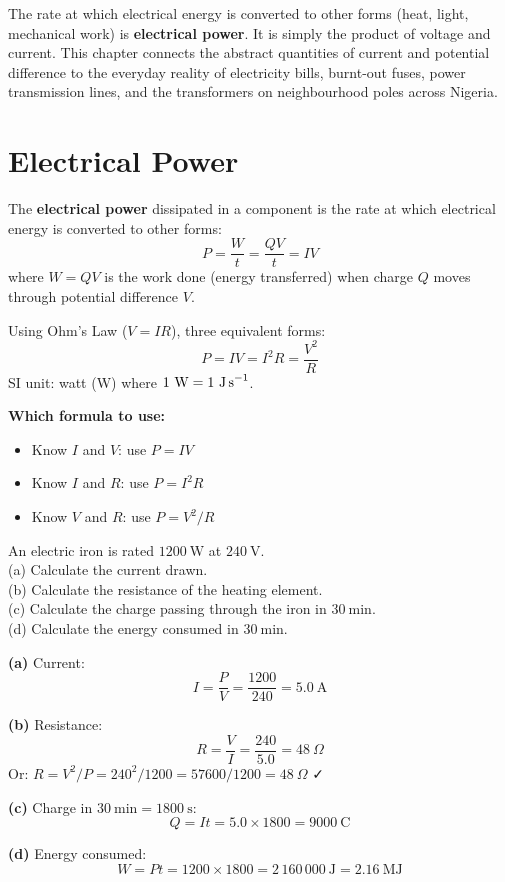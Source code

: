The rate at which electrical energy is converted to
other forms (heat, light, mechanical work) is
\textbf{electrical power}. It is simply the product
of voltage and current. This chapter connects the
abstract quantities of current and potential difference
to the everyday reality of electricity bills, burnt-out
fuses, power transmission lines, and the transformers on neighbourhood poles across Nigeria.

\section{Electrical Power}

\begin{definitionbox}
The \textbf{electrical power} dissipated in a
component is the rate at which electrical energy
is converted to other forms:
\[
  P = \frac{W}{t} = \frac{QV}{t} = IV
\]
where $W = QV$ is the work done (energy transferred)
when charge $Q$ moves through potential difference $V$.

Using Ohm's Law ($V = IR$), three equivalent forms:
\[
  \boxed{P = IV = I^2R = \frac{V^2}{R}}
\]
SI unit: watt (W) where $1\ \text{W}
= 1\ \text{J\,s}^{-1}$.

\textbf{Which formula to use:}
\begin{itemize}[noitemsep]
  \item Know $I$ and $V$: use $P = IV$
  \item Know $I$ and $R$: use $P = I^2R$
  \item Know $V$ and $R$: use $P = V^2/R$
\end{itemize}
\end{definitionbox}

\begin{examplebox}[24.1]
An electric iron is rated $1200\ \text{W}$ at
$240\ \text{V}$.\\
(a) Calculate the current drawn.\\
(b) Calculate the resistance of the heating element.\\
(c) Calculate the charge passing through the iron
in $30\ \text{min}$.\\
(d) Calculate the energy consumed in $30\ \text{min}$.
\end{examplebox}

\begin{solutionbox}
\textbf{(a)} Current:
\[
  I = \frac{P}{V} = \frac{1200}{240} = 5.0\ \text{A}
\]

\textbf{(b)} Resistance:
\[
  R = \frac{V}{I} = \frac{240}{5.0} = 48\ \Omega
\]
Or: $R = V^2/P = 240^2/1200 = 57600/1200 = 48\ \Omega$ ✓

\textbf{(c)} Charge in $30\ \text{min}
= 1800\ \text{s}$:
\[
  Q = It = 5.0 \times 1800 = 9000\ \text{C}
\]

\textbf{(d)} Energy consumed:
\[
  W = Pt = 1200 \times 1800 = 2\,160\,000\ \text{J}
  = 2.16\ \text{MJ}
\]
\end{solutionbox}

